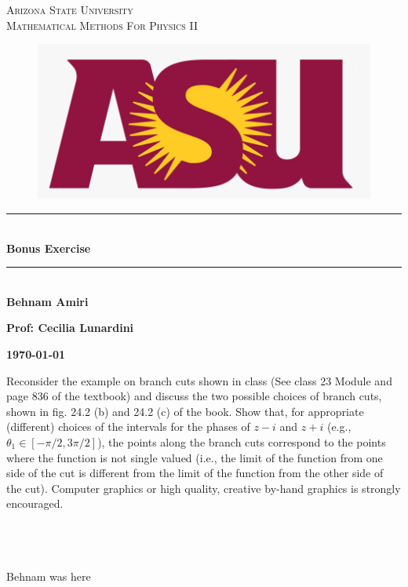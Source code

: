 \documentclass[fleqn]{article}
\begin{document}
  \begin{titlepage}

    \newcommand{\HRule}{\rule{\linewidth}{0.5mm}}

    \center 


    \textsc{\LARGE Arizona State University}\\[1.5cm]

    \textsc{\LARGE Mathematical Methods For Physics II }\\[1.5cm]


    \begin{figure}
      \includegraphics[width=\linewidth]{asu.png}
    \end{figure}


    \HRule \\[0.4cm]
    { \huge \bfseries Bonus Exercise}\\[0.4cm] 
    \HRule \\[1.5cm]

    \textbf{Behnam Amiri}

    \bigbreak

    \textbf{Prof: Cecilia Lunardini}

    \bigbreak


    \textbf{{\large \today}\\[2cm]}

    \vfill

  \end{titlepage}

    Reconsider the example on branch cuts shown in class 
    (See class 23 Module and page 836 of the textbook) and discuss the two possible choices of branch cuts, shown in fig. 
    24.2 (b) and 24.2 (c) of the book. Show that, for appropriate (different) choices of the intervals for the phases 
    of $z-i$ and $z+i$ (e.g., $\theta_1 \in [ -\pi/2 , 3 \pi/2]$), the points along the branch cuts correspond to the 
    points where the function is not single valued (i.e., the limit of the function from one side of the cut is different 
    from the limit of the function from the other side of the cut). Computer graphics or high quality, creative by-hand graphics is strongly encouraged. 

    \textcolor{hwColor}{
      \\
      \\
      \\
      Behnam was here
    }
\end{document}
